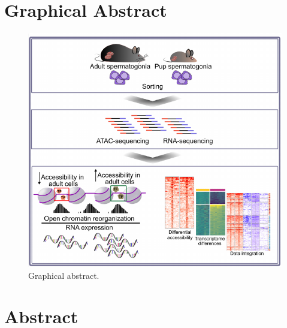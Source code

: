 \documentclass[12pt,twoside]{reedthesis}
\begin{document}
\hypertarget{graphical-abstract}{%
\section{Graphical Abstract}\label{graphical-abstract}}
\begin{figure}[htbp]

{\centering \includegraphics{thesis_files/figure-latex/dga-1} 

}

\caption[Graphical abstract]{Graphical abstract.}\label{fig:dga}
\end{figure}
\newpage

\hypertarget{abstract}{%
\section{Abstract}\label{abstract}}
\end{document}
